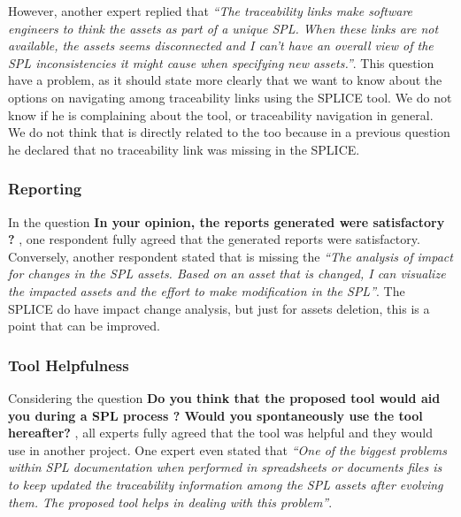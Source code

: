 However, another expert replied that \textit{“The traceability links make software engineers to think the assets as part of a unique SPL. When these links are not available, the assets seems disconnected and I can’t have an overall view of the SPL inconsistencies it might cause when specifying new assets.”}. This question have a problem, as it should state more clearly that we want to know about the options on navigating among traceability links using the \ac{SPLICE} tool. We do not know if he is complaining about the tool, or traceability navigation in general. We do not think that is directly related to the too because in a previous question he declared that no traceability link was missing in the \ac{SPLICE}.


\subsubsection{Reporting}
In the  question \textbf{ In your opinion, the reports generated were satisfactory ?} , one respondent fully agreed that the generated reports were satisfactory. Conversely, another respondent stated that is missing the \textit{“The analysis of impact for changes in the SPL assets. Based on an asset that is changed, I can visualize the impacted assets and the effort to make modification in the SPL”}. The \ac{SPLICE} do have impact change analysis, but just for assets deletion, this is a point that can be improved.


\subsubsection{Tool Helpfulness}
Considering the question \textbf{Do you think that the proposed tool would aid you during a SPL process ? Would you spontaneously use the tool hereafter? }, all experts fully agreed that the tool was helpful and they would use in another project. One expert even stated that \textit{“One of the biggest problems within SPL documentation when performed in spreadsheets or documents files is to keep updated the traceability information among the SPL assets after evolving them. The proposed tool helps in dealing with this problem”}.


